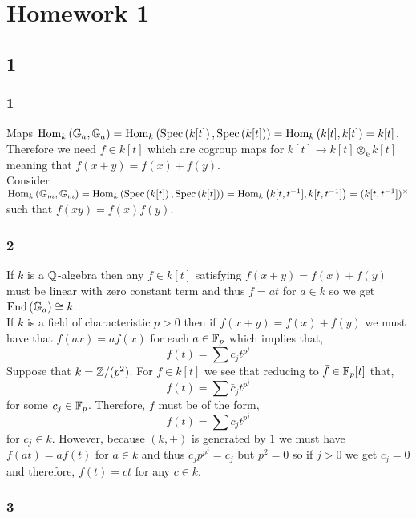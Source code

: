 \documentclass[12pt]{article}
\begin{document}
\section{Homework 1}

\tableofcontents

\subsection{1}

\subsubsection{1}

Maps $\mathrm{Hom}_{k} \left( \mathbb{G}_a, \mathbb{G}_a \right) = \mathrm{Hom}_{k} \left( \mathrm{Spec}\left( k[t] \right), \mathrm{Spec}\left( k[t] \right) \right) = \mathrm{Hom}_{k} \left( k[t], k[t] \right) = k[t]$. Therefore we need $f \in k[t]$ which are cogroup maps for $k[t] \to k[t] \otimes_k k[t]$ meaning that $f(x + y) = f(x) + f(y)$. 
\bigskip\\
Consider $\mathrm{Hom}_{k} \left( \mathbb{G}_m, \mathbb{G}_m \right) = \mathrm{Hom}_{k} \left( \mathrm{Spec}\left( k[t] \right), \mathrm{Spec}\left( k[t] \right) \right) = \mathrm{Hom}_{k} \left( k[t,t^{-1}], k[t,t^{-1}] \right) = (k[t, t^{-1}])^\times$ such that $f(xy) = f(x) f(y)$.

\subsubsection{2}

If $k$ is a $\mathbb{Q}$-algebra then any $f \in k[t]$ satisfying $f(x + y) = f(x) + f(y)$ must be linear with zero constant term and thus $f = a t$ for $a \in k$ so we get $\mathrm{End}\left( \mathbb{G}_a \right) \cong k$. 
\bigskip\\
If $k$ is a field of characteristic $p > 0$ then if $f(x+y) = f(x) + f(y)$ we must have that $f(ax) = a f(x)$ for each $a \in \mathbb{F}_p$ which implies that,
\[ f(t) = \sum c_j t^{p^j} \]
Suppose that $k = \mathbb{Z} / (p^2)$. For $f \in k[t]$ we see that reducing to $\bar{f} \in \mathbb{F}_p[t]$ that,
\[ f(t) = \sum \bar{c}_j t^{p^j} \]
for some $c_j \in \mathbb{F}_p$. Therefore, $f$ must be of the form,
\[ f(t) = \sum c_j t^{p^j} \]
for $c_j \in k$. However, because $(k, +)$ is generated by $1$ we must have $f(at) = a f(t)$ for $a \in k$ and thus $c_j p^{p^j} = c_j$ but $p^2 = 0$ so if $j > 0$ we get $c_j = 0$ and therefore, $f(t) = c t$ for any $c \in k$.

\subsubsection{3}
\end{document}
